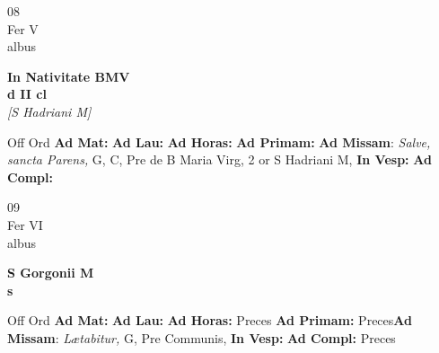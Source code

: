 \documentclass[10pt, openany]{book}
\begin{document}
    \begin{center}
        \begin{minipage}{3.5in}
            \vspace{2em}
            \begin{minipage}{0.5in}
                {\Huge 08} \\
                {\normalsize Fer V} \\
                {\normalsize albus}
            \end{minipage}
            \begin{minipage}{3.0in}
                \textbf{ \large In Nativitate BMV \\
                \textnormal{\normalsize d II cl}} \\ \textit{[S Hadriani M]} \\ 
            \end{minipage}
            \begin{justify}Off Ord
                \textbf{Ad Mat: }
                \textbf{Ad Lau: }
                \textbf{Ad Horas: }
                \textbf{Ad Primam: }\textbf{Ad Missam}: \textit{Salve, sancta Parens,} G, C, Pre de B Maria Virg, 2 or S Hadriani M,  
                \textbf{In Vesp: }
                \textbf{Ad Compl: }
            \end{justify}
        \end{minipage}
    \end{center}

    \begin{center}
        \begin{minipage}{3.5in}
            \vspace{2em}
            \begin{minipage}{0.5in}
                {\Huge 09} \\
                {\normalsize Fer VI} \\
                {\normalsize albus}
            \end{minipage}
            \begin{minipage}{3.0in}
                \textbf{ \large S Gorgonii M \\
                \textnormal{\normalsize s}} \\ 
            \end{minipage}
            \begin{justify}Off Ord
                \textbf{Ad Mat: }
                \textbf{Ad Lau: }
                \textbf{Ad Horas: }Preces
                \textbf{Ad Primam: }Preces\textbf{Ad Missam}: \textit{Lætabitur,} G, Pre Communis,  
                \textbf{In Vesp: }
                \textbf{Ad Compl: }Preces
            \end{justify}
        \end{minipage}
    \end{center}
\end{document}
